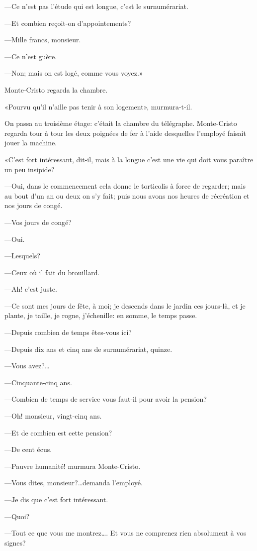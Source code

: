 —Ce n'est pas l'étude qui est longue, c'est le surnumérariat. 

—Et combien reçoit-on d'appointements? 

—Mille francs, monsieur.  

—Ce n'est guère. 

—Non; mais on est logé, comme vous voyez.» 

Monte-Cristo regarda la chambre. 

«Pourvu qu'il n'aille pas tenir à son logement», murmura-t-il. 

On passa au troisième étage: c'était la chambre du télégraphe. Monte-Cristo regarda tour à tour les deux poignées de fer à l'aide desquelles l'employé faisait jouer la machine. 

«C'est fort intéressant, dit-il, mais à la longue c'est une vie qui doit vous paraître un peu insipide? 

—Oui, dans le commencement cela donne le torticolis à force de regarder; mais au bout d'un an ou deux on s'y fait; puis nous avons nos heures de récréation et nos jours de congé. 

—Vos jours de congé? 

—Oui. 

—Lesquels? 

—Ceux où il fait du brouillard. 

—Ah! c'est juste. 

—Ce sont mes jours de fête, à moi; je descends dans le jardin ces jours-là, et je plante, je taille, je rogne, j'échenille: en somme, le temps passe. 

—Depuis combien de temps êtes-vous ici? 

—Depuis dix ans et cinq ans de surnumérariat, quinze. 

—Vous avez?\dots 

—Cinquante-cinq ans. 

—Combien de temps de service vous faut-il pour avoir la pension? 

—Oh! monsieur, vingt-cinq ans. 

—Et de combien est cette pension? 

—De cent écus. 

—Pauvre humanité! murmura Monte-Cristo. 

—Vous dites, monsieur?\dots demanda l'employé. 

—Je dis que c'est fort intéressant. 

—Quoi? 

—Tout ce que vous me montrez\dots. Et vous ne comprenez rien absolument à vos signes? 

